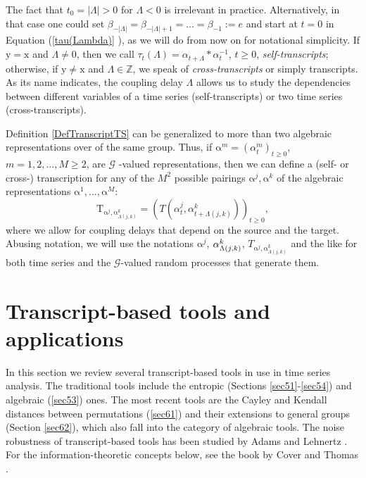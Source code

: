 \documentclass[%
 aip,
 amsmath,amssymb,
 reprint,%
]{revtex4-1}
\begin{document}
The fact that $t_{0}=\left\vert \Lambda \right\vert >0$ for $\Lambda <0$ is
irrelevant in practice. Alternatively, in that case one could set $\beta
_{-\left\vert \Lambda \right\vert }=\beta _{-\left\vert \Lambda \right\vert
+1}=\ldots =\beta _{-1}:=e$ and start at $t=0$ in Equation (\ref{tau(Lambda)}%
), as we will do from now on for notational simplicity. If $\mathrm{y}=%
\mathrm{x}$ and $\Lambda \neq 0$, then we call $\tau _{t}(\Lambda )=\alpha
_{t+\Lambda }\ast \alpha _{t}^{-1}$, $t\geq 0$, \textit{self-transcripts};
otherwise, if $\mathrm{y}\neq \mathrm{x}$ and $\Lambda \in \mathbb{Z}$, we
speak of \textit{cross-transcripts} or simply transcripts. As its name
indicates, the coupling delay $\Lambda $ allows us to study the dependencies
between different variables of a time series (self-transcripts) or two time
series (cross-transcripts).

Definition \ref{DefTranscriptTS} can be generalized to more than two
algebraic representations over of the same group. Thus, if $\mathrm{\alpha }%
^{m}=(\alpha _{t}^{m})_{t\geq 0}$, $m=1,2,...,M\geq 2$, are $\mathcal{G}$%
-valued representations, then we can define a (self- or cross-)
transcription for any of the $M^{2}$ possible pairings $\mathrm{\alpha }^{j},%
\mathrm{\alpha }^{k}$ of the algebraic representations $\mathrm{\alpha }%
^{1},...,\mathrm{\alpha }^{M}$:%
\begin{equation}
\mathrm{T}_{\mathrm{\alpha }^{j},\mathrm{\alpha }_{\Lambda
(j,k)}^{k}}=(T(\alpha _{t}^{j},\alpha _{t+\Lambda (j,k)}^{k}))_{t\geq 0},
\label{M transcripts}
\end{equation}%
where we allow for coupling delays that depend on the source and the target.
Abusing notation, we will use the notations $\mathrm{\alpha }^{j}$, $\mathrm{%
\alpha }_{\Lambda (j,k)}^{k}$, $T_{\mathrm{\alpha }^{j},\mathrm{\alpha }%
_{\Lambda (j,k)}^{k}}$ and the like for both time series and the $\mathcal{G}
$-valued random processes that generate them.


\section{Transcript-based tools and applications}

\label{sec5}

In this section we review several transcript-based tools in use in time series analysis. The traditional tools include the entropic (Sections \ref{sec51}-\ref{sec54}) and algebraic (\ref{sec53}) ones. The most recent tools are the Cayley and Kendall distances between permutations (\ref{sec61}) and their extensions to general groups (Section \ref{sec62}), which also fall into the category of algebraic tools. The noise robustness of transcript-based tools has been studied by Adams and Lehnertz \cite{Adams2025}. For the information-theoretic concepts below, see the book by Cover and Thomas \cite{Cover2006}.
\end{document}
